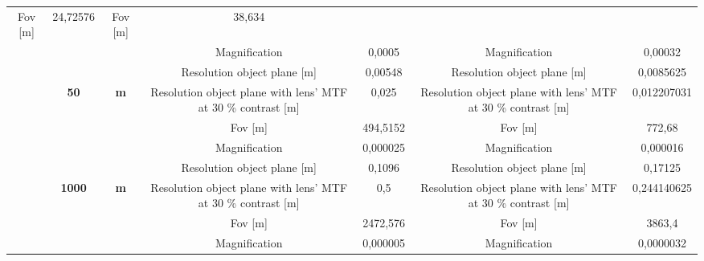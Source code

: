 \begin{table}[H]
{\begin{tabular}{ccc|cc|cc|}
  \cellcolor[HTML]{EFEFEF}Fov {[}m{]} &
  \cellcolor[HTML]{EFEFEF}24,72576 &
  \cellcolor[HTML]{EFEFEF}Fov {[}m{]} &
  \cellcolor[HTML]{EFEFEF}38,634 \\
\multicolumn{1}{|c|}{} &
  \cellcolor[HTML]{EFEFEF} &
  \cellcolor[HTML]{EFEFEF} &
  Magnification &
  0,0005 &
  Magnification &
  0,00032 \\
\multicolumn{1}{|c|}{} &
  \cellcolor[HTML]{EFEFEF} &
  \cellcolor[HTML]{EFEFEF} &
  \cellcolor[HTML]{EFEFEF}Resolution object plane {[}m{]} &
  \cellcolor[HTML]{EFEFEF}0,00548 &
  \cellcolor[HTML]{EFEFEF}Resolution object plane {[}m{]} &
  \cellcolor[HTML]{EFEFEF}0,0085625 \\
\multicolumn{1}{|c|}{} &
  \multirow{-4}{*}{\cellcolor[HTML]{EFEFEF}\textbf{50}} &
  \multirow{-4}{*}{\cellcolor[HTML]{EFEFEF}\textbf{m}} &
  Resolution object plane with lens' MTF at 30 \% contrast {[}m{]} &
  0,025 &
  Resolution object plane with lens' MTF at 30 \% contrast {[}m{]} &
  0,012207031 \\ \cline{2-7} 
\multicolumn{1}{|c|}{} &
  \cellcolor[HTML]{EFEFEF} &
  \cellcolor[HTML]{EFEFEF} &
  \cellcolor[HTML]{EFEFEF}Fov {[}m{]} &
  \cellcolor[HTML]{EFEFEF}494,5152 &
  \cellcolor[HTML]{EFEFEF}Fov {[}m{]} &
  \cellcolor[HTML]{EFEFEF}772,68 \\
\multicolumn{1}{|c|}{} &
  \cellcolor[HTML]{EFEFEF} &
  \cellcolor[HTML]{EFEFEF} &
  Magnification &
  0,000025 &
  Magnification &
  0,000016 \\
\multicolumn{1}{|c|}{} &
  \cellcolor[HTML]{EFEFEF} &
  \cellcolor[HTML]{EFEFEF} &
  \cellcolor[HTML]{EFEFEF}Resolution object plane {[}m{]} &
  \cellcolor[HTML]{EFEFEF}0,1096 &
  \cellcolor[HTML]{EFEFEF}Resolution object plane {[}m{]} &
  \cellcolor[HTML]{EFEFEF}0,17125 \\
\multicolumn{1}{|c|}{} &
  \multirow{-4}{*}{\cellcolor[HTML]{EFEFEF}\textbf{1000}} &
  \multirow{-4}{*}{\cellcolor[HTML]{EFEFEF}\textbf{m}} &
  Resolution object plane with lens' MTF at 30 \% contrast {[}m{]} &
  0,5 &
  Resolution object plane with lens' MTF at 30 \% contrast {[}m{]} &
  0,244140625 \\ \cline{2-7} 
\multicolumn{1}{|c|}{} &
  \cellcolor[HTML]{EFEFEF} &
  \cellcolor[HTML]{EFEFEF} &
  \cellcolor[HTML]{EFEFEF}Fov {[}m{]} &
  \cellcolor[HTML]{EFEFEF}2472,576 &
  \cellcolor[HTML]{EFEFEF}Fov {[}m{]} &
  \cellcolor[HTML]{EFEFEF}3863,4 \\
\multicolumn{1}{|c|}{} &
  \cellcolor[HTML]{EFEFEF} &
  \cellcolor[HTML]{EFEFEF} &
  Magnification &
  0,000005 &
  Magnification &
  0,0000032 \\

\end{tabular}}
\end{table}
